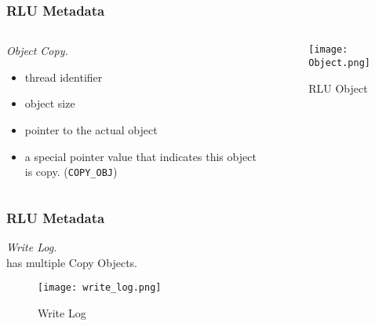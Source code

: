 \documentclass{beamer}
\begin{document}

\begin{frame}[t]
  \frametitle{RLU Metadata}

  \begin{columns}
    \begin{column}{.5\textwidth}
      \emph{Object Copy.}
      \begin{itemize}
      \item thread identifier
      \item object size
      \item pointer to the actual object
      \item a special pointer value that indicates this
        object is copy. (\texttt{COPY\_OBJ})
      \end{itemize}
    \end{column}

    \begin{column}{.5\textwidth}
      \begin{figure}[ht]
        \centering
        \texttt{[image: Object.png]}
        \caption{RLU Object}
      \end{figure}
    \end{column}
  \end{columns}
  
\end{frame}


\begin{frame}[t]
  \frametitle{RLU Metadata}

  \emph{Write Log.}\\
  has multiple Copy Objects.

  \begin{figure}[ht]
    \centering
    \texttt{[image: write\_log.png]}
    \caption{Write Log}
  \end{figure}
  
\end{frame}

\end{document}
